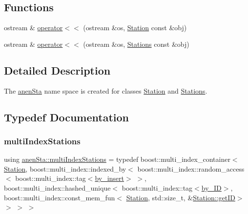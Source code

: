 \subsection*{Functions}
\begin{DoxyCompactItemize}
\item 
ostream \& \mbox{\hyperlink{namespaceanen_sta_abbe68650f0c5b4173991ed2220b3143f}{operator$<$$<$}} (ostream \&os, \mbox{\hyperlink{classanen_sta_1_1_station}{Station}} const \&obj)
\item 
ostream \& \mbox{\hyperlink{namespaceanen_sta_a08ae85128c31bfbd2999f821d7605eeb}{operator$<$$<$}} (ostream \&os, \mbox{\hyperlink{classanen_sta_1_1_stations}{Stations}} const \&obj)
\end{DoxyCompactItemize}


\subsection{Detailed Description}
The \mbox{\hyperlink{namespaceanen_sta}{anen\+Sta}} name space is created for classes \mbox{\hyperlink{classanen_sta_1_1_station}{Station}} and \mbox{\hyperlink{classanen_sta_1_1_stations}{Stations}}. 

\subsection{Typedef Documentation}
\mbox{\label{namespaceanen_sta_a913b335ef67a3eed40106e55b9a4582c}} 
\subsubsection{\texorpdfstring{multi\+Index\+Stations}{multiIndexStations}}
{\footnotesize\ttfamily using \mbox{\hyperlink{namespaceanen_sta_a913b335ef67a3eed40106e55b9a4582c}{anen\+Sta\+::multi\+Index\+Stations}} = typedef boost\+::multi\+\_\+index\+\_\+container$<$ \mbox{\hyperlink{classanen_sta_1_1_station}{Station}}, boost\+::multi\+\_\+index\+::indexed\+\_\+by$<$ boost\+::multi\+\_\+index\+::random\+\_\+access$<$ boost\+::multi\+\_\+index\+::tag$<$\mbox{\hyperlink{structanen_sta_1_1by__insert}{by\+\_\+insert}}$>$ $>$, boost\+::multi\+\_\+index\+::hashed\+\_\+unique$<$ boost\+::multi\+\_\+index\+::tag$<$\mbox{\hyperlink{structanen_sta_1_1by___i_d}{by\+\_\+\+ID}}$>$, boost\+::multi\+\_\+index\+::const\+\_\+mem\+\_\+fun$<$ \mbox{\hyperlink{classanen_sta_1_1_station}{Station}}, std\+::size\+\_\+t, \&\mbox{\hyperlink{classanen_sta_1_1_station_a7da5e30ee0d25653333630aa61ca5257}{Station\+::get\+ID}}$>$ $>$ $>$ $>$}

